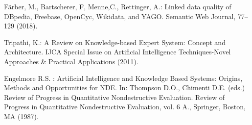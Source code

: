 \documentclass[runningheads]{llncs}
\begin{document}
\begin{thebibliography}{8}
F{\"a}rber, M., Bartscherer, F, Menne,C., Rettinger, A.: Linked data quality of DBpedia, Freebase, OpenCyc, Wikidata, and YAGO. Semantic Web Journal, 77--129 (2018). 

Tripathi, K.: A Review on Knowledge-based Expert System: Concept and Architecture. IJCA Special Issue on Artificial Intelligence Techniques-Novel Approaches \& Practical Applications (2011). 

Engelmore R.S.  : Artificial Intelligence and Knowledge Based Systems: Origins, Methods and Opportunities for NDE. In: Thompson D.O., Chimenti D.E. (eds.) Review of Progress in Quantitative Nondestructive Evaluation. Review of Progress in Quantitative Nondestructive Evaluation, vol. 6 A., 
Springer, Boston, MA (1987). 


\end{thebibliography}

\end{document}
